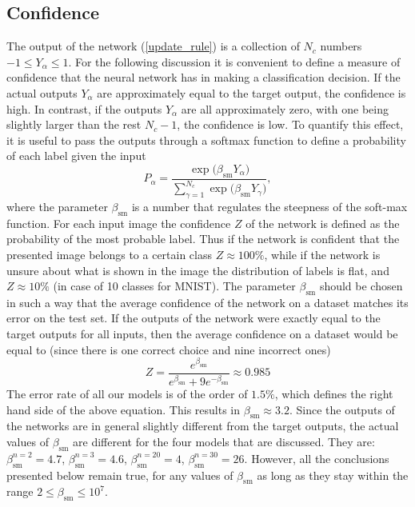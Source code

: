 \subsection*{Confidence}
The output of the network (\ref{update_rule}) is a collection of $N_c$ numbers $-1\leq Y_\alpha\leq 1$. For the following discussion it is convenient to define a measure of confidence that the neural network has in making a classification decision. If the actual outputs $Y_\alpha$ are approximately equal to the target output, the confidence is high. In contrast, if the outputs $Y_\alpha$ are all approximately zero, with one being slightly larger than the rest $N_c-1$, the confidence is low. To quantify this effect, it is useful to pass the outputs through a softmax function to define a probability of each label given the input $$
P_\alpha = \frac{\exp\big(\beta_{\text{sm}} Y_\alpha\big)}{\sum\limits_{\gamma=1}^{N_c} \exp\big(\beta_{\text{sm}} Y_\gamma\big)},
$$ 
where the parameter $\beta_{\text{sm}}$ is a number that regulates the steepness of the soft-max function. For each input image the confidence $Z$ of the network is defined as the probability of the most probable label. Thus if the network is confident that the presented image belongs to a certain class $Z \approx 100\%$, while if the network is unsure about what is shown in the image the distribution of labels is flat, and $Z \approx 10\%$ (in case of 10 classes for MNIST). The parameter $\beta_{\text{sm}}$ should be chosen in such a way that the average confidence of the network on a dataset matches its error on the test set. If the outputs of the network were exactly equal to the target outputs for all inputs, then the average confidence on a dataset would be equal to (since there is one correct choice and nine incorrect ones) $$
Z=\frac{e^{\beta_{\text{sm}}}}{e^{\beta_{\text{sm}}} + 9 e^{-\beta_{\text{sm}}}} \approx 0.985 $$ The error rate of all our models is of the order of $1.5\%$, which defines the right hand side of the above equation. This results in $\beta_{\text{sm}}\approx 3.2$.  Since the outputs of the networks are in general slightly different from the target outputs, the actual values of $\beta_{\text{sm}}$ are different for the four models that are discussed. They are: $\beta_{\text{sm}}^{n=2}=4.7$, $\beta_{\text{sm}}^{n=3}=4.6$, $\beta_{\text{sm}}^{n=20}=4$, $\beta_{\text{sm}}^{n=30}=26$. However, all the conclusions presented below remain true, for any values of $\beta_{\text{sm}}$ as long as they stay within the range $2\leq\beta_{\text{sm}}\leq 10^7$.  

